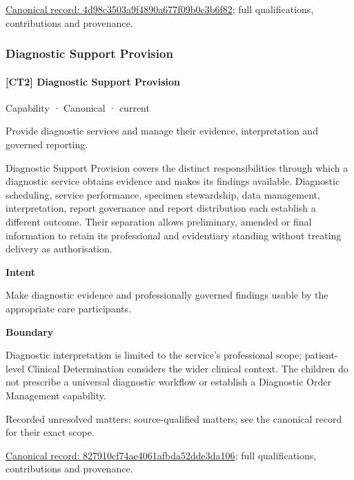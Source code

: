 {\footnotesize \href{../../../../continuum/strategy/capability/4d98c3503a9f4890a677f09b0c3b6f82.md}{Canonical record: 4d98c3503a9f4890a677f09b0c3b6f82}; full qualifications, contributions and provenance.}\par
\subsubsection{Diagnostic Support Provision}

\paragraph{[CT2] Diagnostic Support Provision}

\label{element:827910cf74ae4061afbda52dde3da106}
{\small Capability · Canonical · current}\par

Provide diagnostic services and manage their evidence, interpretation and governed reporting.



Diagnostic Support Provision covers the distinct responsibilities through which a diagnostic service obtains evidence and makes its findings available. Diagnostic scheduling, service performance, specimen stewardship, data management, interpretation, report governance and report distribution each establish a different outcome. Their separation allows preliminary, amended or final information to retain its professional and evidentiary standing without treating delivery as authorisation.



\textbf{Intent}



Make diagnostic evidence and professionally governed findings usable by the appropriate care participants.



\textbf{Boundary}



Diagnostic interpretation is limited to the service's professional scope; patient-level Clinical Determination considers the wider clinical context. The children do not prescribe a universal diagnostic workflow or establish a Diagnostic Order Management capability.


{\small Recorded unresolved matters: source-qualified matters; see the canonical record for their exact scope.}\par
{\footnotesize \href{../../../../continuum/strategy/capability/827910cf74ae4061afbda52dde3da106.md}{Canonical record: 827910cf74ae4061afbda52dde3da106}; full qualifications, contributions and provenance.}\par
